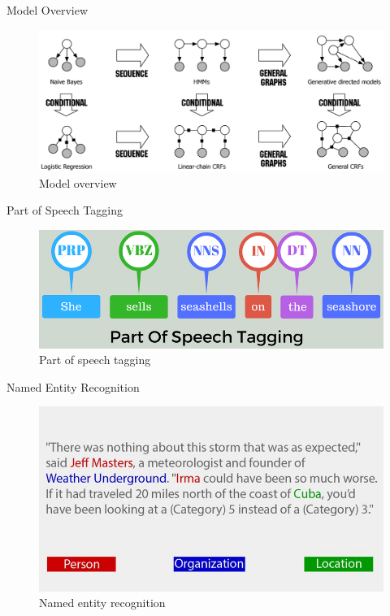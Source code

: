 \begin{frame}{Model Overview}{}
	\begin{figure}
		\includegraphics[scale=0.25]{img/model_overview}
		\caption{Model overview}
	\end{figure}
\end{frame}


\begin{frame}{Part of Speech Tagging}{}
	\begin{figure}
		\includegraphics[scale=0.4]{img/pos_tagging}
		\caption{Part of speech tagging}
	\end{figure}
\end{frame}


\begin{frame}{Named Entity Recognition}{}
	\begin{figure}
		\includegraphics[scale=0.35]{img/ner}
		\caption{Named entity recognition}
	\end{figure}
\end{frame}


